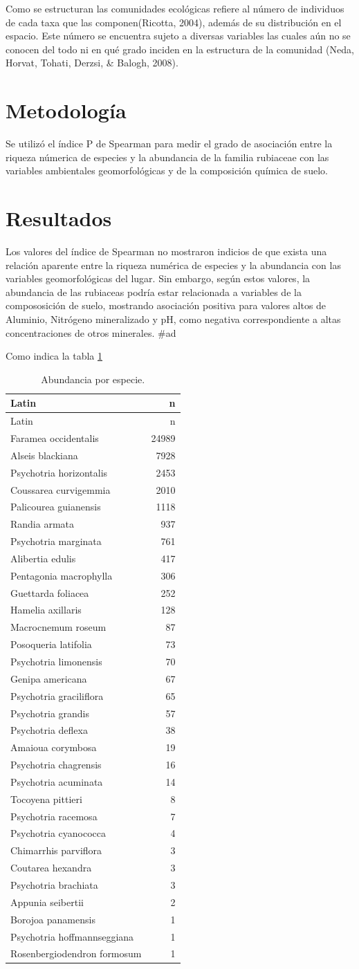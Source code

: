 \documentclass[11pt,]{article}
\begin{document}
Como se estructuran las comunidades ecológicas refiere al número de
individuos de cada taxa que las componen(Ricotta, 2004), además de su
distribución en el espacio. Este número se encuentra sujeto a diversas
variables las cuales aún no se conocen del todo ni en qué grado inciden
en la estructura de la comunidad (Neda, Horvat, Tohati, Derzsi, \&
Balogh, 2008).

\section{Metodología}\label{metodologuxeda}

Se utilizó el índice P de Spearman para medir el grado de asociación
entre la riqueza númerica de especies y la abundancia de la familia
rubiaceae con las variables ambientales geomorfológicas y de la
composición química de suelo.

\section{Resultados}\label{resultados}

Los valores del índice de Spearman no mostraron indicios de que exista
una relación aparente entre la riqueza numérica de especies y la
abundancia con las variables geomorfológicas del lugar. Sin embargo,
según estos valores, la abundancia de las rubiaceas podría estar
relacionada a variables de la compososición de suelo, mostrando
asociación positiva para valores altos de Aluminio, Nitrógeno
mineralizado y pH, como negativa correspondiente a altas concentraciones
de otros minerales. \#ad

Como indica la tabla \ref{tab:abun_sp}

\begin{longtable}[]{@{}lr@{}}
\caption{\label{tab:abun_sp}Abundancia por especie.}\tabularnewline
\toprule
Latin & n\tabularnewline
\midrule
\endfirsthead
\toprule
Latin & n\tabularnewline
\midrule
\endhead
Faramea occidentalis & 24989\tabularnewline
Alseis blackiana & 7928\tabularnewline
Psychotria horizontalis & 2453\tabularnewline
Coussarea curvigemmia & 2010\tabularnewline
Palicourea guianensis & 1118\tabularnewline
Randia armata & 937\tabularnewline
Psychotria marginata & 761\tabularnewline
Alibertia edulis & 417\tabularnewline
Pentagonia macrophylla & 306\tabularnewline
Guettarda foliacea & 252\tabularnewline
Hamelia axillaris & 128\tabularnewline
Macrocnemum roseum & 87\tabularnewline
Posoqueria latifolia & 73\tabularnewline
Psychotria limonensis & 70\tabularnewline
Genipa americana & 67\tabularnewline
Psychotria graciliflora & 65\tabularnewline
Psychotria grandis & 57\tabularnewline
Psychotria deflexa & 38\tabularnewline
Amaioua corymbosa & 19\tabularnewline
Psychotria chagrensis & 16\tabularnewline
Psychotria acuminata & 14\tabularnewline
Tocoyena pittieri & 8\tabularnewline
Psychotria racemosa & 7\tabularnewline
Psychotria cyanococca & 4\tabularnewline
Chimarrhis parviflora & 3\tabularnewline
Coutarea hexandra & 3\tabularnewline
Psychotria brachiata & 3\tabularnewline
Appunia seibertii & 2\tabularnewline
Borojoa panamensis & 1\tabularnewline
Psychotria hoffmannseggiana & 1\tabularnewline
Rosenbergiodendron formosum & 1\tabularnewline
\bottomrule
\end{longtable}
\end{document}
